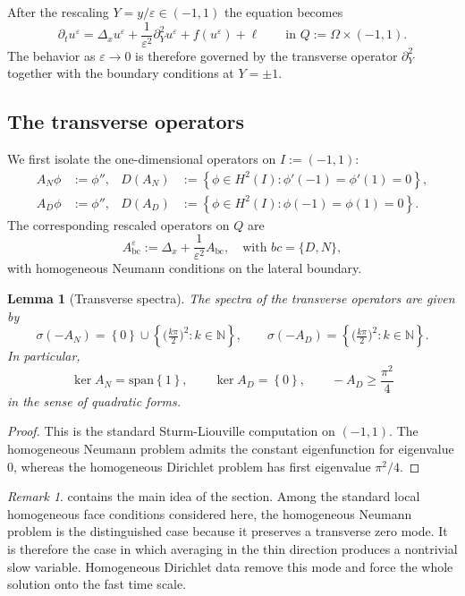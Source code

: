 \documentclass[11pt]{article}
\newtheorem{lemma}[theorem]{Lemma}
\theoremstyle{definition}
\theoremstyle{remark}
\newtheorem{remark}[theorem]{Remark}
\numberwithin{equation}{section}
\newcommand{\eps}{\varepsilon}
\newcommand{\N}{\mathbb{N}}
\newcommand{\Q}{Q}
\newcommand{\Om}{\Omega}
\newcommand{\set}[1]{\left\{#1\right\}}
\begin{document}
After the rescaling $Y=y/\eps\in(-1,1)$ the equation becomes
\begin{equation}\label{eq:flat-rescaled}
\partial_t u^\eps = \Delta_x u^\eps + \frac{1}{\eps^2}\partial_Y^2u^\eps + f(u^\eps)+\ell
\qquad \text{in }\Q:=\Om\times(-1,1).
\end{equation}
The behavior as $\eps\to 0$ is therefore governed by the transverse operator $\partial_Y^2$ together with the boundary conditions at $Y=\pm1$.


\subsection{The transverse operators}

We first isolate the one-dimensional operators on $I:=(-1,1)$:
\begin{align*}
A_N\phi &:= \phi'', & D(A_N)&:=\set{\phi\in H^2(I): \phi'(-1)=\phi'(1)=0},\\
A_D\phi &:= \phi'', & D(A_D)&:=\set{\phi\in H^2(I): \phi(-1)=\phi(1)=0}.
\end{align*}
The corresponding rescaled operators on $\Q$ are
\[
A_{\mathrm{bc}}^\eps := \Delta_x + \frac{1}{\eps^2}A_{\mathrm{bc}},\quad \text{with } bc=\{D,N\},
\]
with homogeneous Neumann conditions on the lateral boundary.

\begin{lemma}[Transverse spectra]\label{lem:transverse-spectra}
The spectra of the transverse operators are given by
\[
\sigma(-A_N)=\set{0}\cup \set{\bigl(\tfrac{k\pi}{2}\bigr)^2:k\in\N},
\qquad
\sigma(-A_D)=\set{\bigl(\tfrac{k\pi}{2}\bigr)^2:k\in\N}.
\]
In particular,
\[
\ker A_N = \mathrm{span}\set{1},
\qquad
\ker A_D = \set{0},
\qquad
-A_D\ge \frac{\pi^2}{4}
\]
in the sense of quadratic forms.
\end{lemma}

\begin{proof}
This is the standard Sturm-Liouville computation on $(-1,1)$. The homogeneous Neumann problem admits the constant eigenfunction for eigenvalue $0$, whereas the homogeneous Dirichlet problem has first eigenvalue $\pi^2/4$.
\end{proof}

\begin{remark}
 contains the main idea of the section. Among the standard local homogeneous face conditions considered here, the homogeneous Neumann problem is the distinguished case because it preserves a transverse zero mode. It is therefore the case in which averaging in the thin direction produces a nontrivial slow variable. Homogeneous Dirichlet data remove this mode and force the whole solution onto the fast time scale.
\end{remark}
\end{document}
